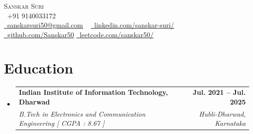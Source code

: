\documentclass[letterpaper,11pt]{article}
\makeatletter
\newcommand{\resumeSubheading}[4]{
  \vspace{-2pt}\item
    \begin{tabular*}{1.0\textwidth}[t]{l@{\extracolsep{\fill}}r}
      \textbf{#1} & \textbf{\small #2} \\
      \textit{\small#3} & \textit{\small #4} \\
    \end{tabular*}\vspace{-7pt}
}
\newcommand{\resumeSubHeadingListStart}{\begin{itemize}[leftmargin=0.0in, label={}]}
\newcommand{\resumeSubHeadingListEnd}{\end{itemize}}
\makeatother
\begin{document}

\begin{center}
    {\Huge \scshape Sanskar Suri} \\ \vspace{1pt}
    {\normalsize\faPhone\ {+91 9140033172}} \\  \vspace{1pt}
    \href{mailto:x@gmail.com}{\raisebox{-0.2\height}\faEnvelope\  \underline{sanskarsuri50@gmail.com}} ~ 
    \href{https://linkedin.com/in/sanskar-suri-882069228/}{\raisebox{-0.2\height}\faLinkedin\ \underline{linkedin.com/sanskar-suri/}}  ~
    \href{https://github.com/Sanskar50}{\raisebox{-0.2\height}\faGithub\ \underline{github.com/Sanskar50}}
     \hspace{1pt}
    \small \href{https://leetcode.com/u/sanskar50/} {\raisebox{-0.1\height}\faCode\
    \underline{leetcode.com/sanskar50/}} 
    \vspace{-8pt}
\end{center}

\section{Education}
  \resumeSubHeadingListStart
    \resumeSubheading
      {Indian Institute of Information Technology, Dharwad}{Jul. 2021 -- Jul. 2025}
      {B.Tech in Electronics and Communication Engineering [ CGPA : 8.67 ]}{Hubli-Dharwad, Karnataka}
        \vspace{-8pt}
  \resumeSubHeadingListEnd
\end{document}
